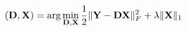 \documentclass{standalone}
\begin{document}
$ \displaystyle
    (\mathbf{D}, \mathbf{X}) = \arg\min_{\mathbf{D}, \mathbf{X}} \frac{1}{2} \|\mathbf{Y} - \mathbf{D}\mathbf{X}\|_F^2 + \lambda \|\mathbf{X}\|_1 
$
\end{document}
